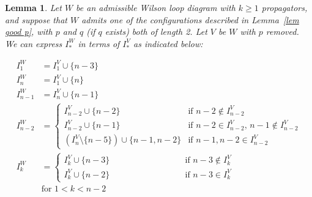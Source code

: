 \documentclass[11pt]{article}
\newtheorem{lem}[thm]{Lemma}
\theoremstyle{remark}
\theoremstyle{definition}
\begin{document}
\begin{lem}\label{lem I}
Let $W$ be an admissible Wilson loop diagram with $k\geq 1$ propagators, and suppose that $W$ admits one of the configurations described in Lemma~\ref{lem good p}, with $p$ and $q$ (if $q$ exists) both of length 2. Let $V$ be $W$ with $p$ removed.  We can express $I_*^W$ in terms of $I_*^V$ as indicated below:

  \begin{align*}
    I_1^{W} & = I_1^{V} \cup \{n-3\} \\
    I_n^{W} & = I_1^{V} \cup \{n\} \\
    I_{n-1}^{W} & = I_n^{V} \cup \{n-1\} \\
    I_{n-2}^{W} & =
    \begin{cases}
      I_{n-2}^{V}\cup \{n-2\} & \text{if $n-2\not\in I_{n-2}^{V}$} \\
      I_{n-2}^{V}\cup \{n-1\} & \text{if $n-2\in I_{n-2}^{V}$, $n-1\not\in I_{n-2}^{V}$} \\
      (I_{n}^{V} \setminus \{n-5\})\cup \{n-1,n-2\} & \text{if $n-1, n-2\in I_{n-2}^{V}$}
    \end{cases} \\
    I_{k}^{W} & =
    \begin{cases}
      I_k^{V}\cup \{n-3\} & \qquad \qquad \qquad \qquad \text{if $n-3 \not\in I_k^{V}$}\\
      I_k^{V}\cup\{n-2\} & \qquad \qquad \qquad \qquad \text{if $n-3\in I_k^{V}$}
    \end{cases} \\
    & \text{for $1<k<n-2$}
  \end{align*}
\end{lem}
\end{document}
